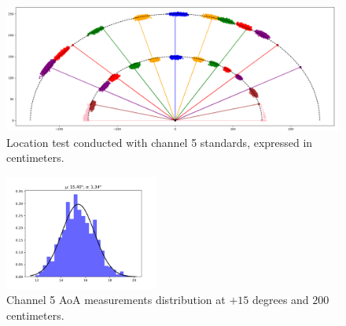 \begin{figure}
    \centering
    \includegraphics[width=1.0\textwidth]{images/ch5_characterization.png}
    \caption{Location test conducted with channel 5 standards, expressed in centimeters.}
    \label{UWB:fig:ch5test}
\end{figure}

\begin{figure}
    \centering
    \includegraphics[width=0.45\textwidth]{images/ch5_aoa_hist.png}
    \caption{Channel 5 AoA measurements distribution at $+15$ degrees and $200$ centimeters.}
    \label{UWB:fig:AoA_ch5}
\end{figure}

